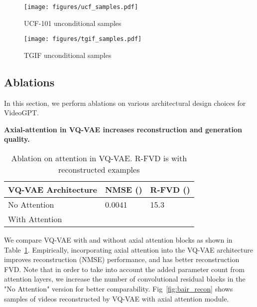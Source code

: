 \begin{figure*}[ht]
\begin{minipage}{\textwidth}
        \centering
    \texttt{[image: figures/ucf\_samples.pdf]}
    \caption{ UCF-101 unconditional samples}
    \label{fig:ucf}
\end{minipage}
\begin{minipage}{\textwidth}
        \centering
    \texttt{[image: figures/tgif\_samples.pdf]}
    \caption{ TGIF unconditional samples}
    \label{fig:tgif}
\end{minipage}


\end{figure*}

\subsection{Ablations}
In this section, we perform ablations on various architectural design choices for VideoGPT.

\textbf{Axial-attention in VQ-VAE increases reconstruction and generation quality.}
\begin{table}[H]
    \begin{minipage}{.5\textwidth}
        \centering

        \caption{Ablation on attention in VQ-VAE. R-FVD is with reconstructed examples}
        \label{table:abl_vqvae_attn}
        \begin{tabular}{@{}lll@{}}
            \toprule
            VQ-VAE Architecture & NMSE ()       & R-FVD ()   \\ \midrule
            No Attention        & 0.0041      & 15.3  \\
            With Attention      &  &  \\ \bottomrule
        \end{tabular}
    \end{minipage}
\end{table}
We compare VQ-VAE with and without axial attention blocks as shown in Table~\ref{table:abl_vqvae_attn}. Empirically, incorporating axial attention into the VQ-VAE architecture improves reconstruction (NMSE) performance, and has better reconstruction FVD. Note that in order to take into account the added parameter count from attention layers, we increase the number of convolutional residual blocks in the "No Attention" version for better comparability. Fig~\ref{fig:bair_recon} shows samples of videos reconstructed by VQ-VAE with axial attention module. 

